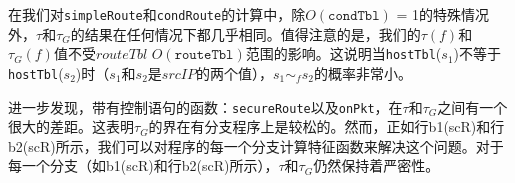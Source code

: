 在我们对\texttt{simpleRoute}和\texttt{condRoute}的计算中，除$O(\texttt{condTbl})$ = 1的特殊情况外，$\tau$和$\tau_G$的结果在任何情况下都几乎相同。值得注意的是，我们的$\tau(f)$和$\tau_G(f)$值不受$routeTbl$ $O(\texttt{routeTbl})$范围的影响。这说明当\texttt{hostTbl}($s_1$)不等于\texttt{hostTbl}($s_2$)时（$s_1$和$s_2$是$srcIP$的两个值），$s_1 \sim_f s_2$的概率非常小。



进一步发现，带有控制语句的函数：\texttt{secureRoute}以及\texttt{onPkt}，在$\tau$和$\tau_G$之间有一个很大的差距。这表明$\tau_G$的界在有分支程序上是较松的。然而，正如行b1(scR)和行b2(scR)所示，我们可以对程序的每一个分支计算特征函数来解决这个问题。对于每一个分支（如b1(scR)和行b2(scR)所示），$\tau$和$\tau_G$仍然保持着严密性。


